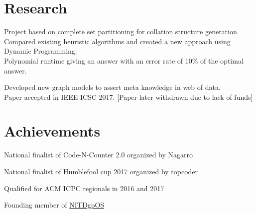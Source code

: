 \documentclass[letterpaper]{deedy-resume} %
\begin{document}
\begin{minipage}[t]{0.66\textwidth}





\section{Research}


Project based on complete set partitioning for collation structure generation.\\
Compared existing heuristic algorithms and created a new approach using Dynamic Programming.\\
Polynomial runtime giving an answer with an error rate of 10\% of the optimal answer.

\sectionspace


Developed new graph models to assert meta knowledge in web of data. \\
Paper accepted in IEEE ICSC 2017. [Paper later withdrawn due to lack of funds]

\sectionspace


\section{Achievements}

\sectionspace

\begin{tightitemize}
\item National finalist of Code-N-Counter 2.0 organized by Nagarro\\
\item National finalist of Humblefool cup 2017 organized by topcoder\\
\item Qualified for ACM ICPC regionals in 2016 and 2017\\
\item Founding member of \href{https://github.com/NITDgpOS}{NITDgpOS}
\end{tightitemize}


\end{minipage} %
\end{document}
